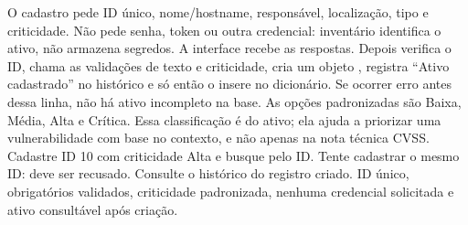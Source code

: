 
 O cadastro pede ID único, nome/hostname, responsável, localização, tipo e criticidade. Não pede senha, token ou outra credencial: inventário identifica o ativo, não armazena segredos.
 A interface recebe as respostas. Depois  verifica o ID, chama as validações de texto e criticidade, cria um objeto , registra ``Ativo cadastrado'' no histórico e só então o insere no dicionário. Se ocorrer erro antes dessa linha, não há ativo incompleto na base.
 As opções padronizadas são Baixa, Média, Alta e Crítica. Essa classificação é do ativo; ela ajuda a priorizar uma vulnerabilidade com base no contexto, e não apenas na nota técnica CVSS.
 Cadastre ID 10 com criticidade Alta e busque pelo ID. Tente cadastrar o mesmo ID: deve ser recusado. Consulte o histórico do registro criado.
 ID único, obrigatórios validados, criticidade padronizada, nenhuma credencial solicitada e ativo consultável após criação.

